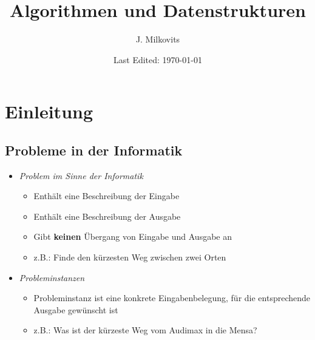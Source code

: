 

\begin{titlepage}
  \title{Algorithmen und Datenstrukturen} %
  \author{J. Milkovits}
  \date{Last Edited: \today}
\end{titlepage}



\maketitle
{} %
\tableofcontents
\clearpage
{} %


\section{Einleitung}
\subsection{Probleme in der Informatik}
\begin{itemize} 
    \item \textit{Problem im Sinne der Informatik}
	    \begin{itemize}
          	\item Enthält eine Beschreibung der Eingabe 
          	\item Enthält eine Beschreibung der Ausgabe
          	\item Gibt \textbf{keinen} Übergang von Eingabe und Ausgabe an
          	\item z.B.: Finde den kürzesten Weg zwischen zwei Orten
	    \end{itemize}
	
    \item \textit{Probleminstanzen}
        \begin{itemize}
          	\item Probleminstanz ist eine konkrete Eingabenbelegung, für die entsprechende Ausgabe gewünscht ist
          	\item z.B.: Was ist der kürzeste Weg vom Audimax in die Mensa?
    	\end{itemize}

\end{itemize}

